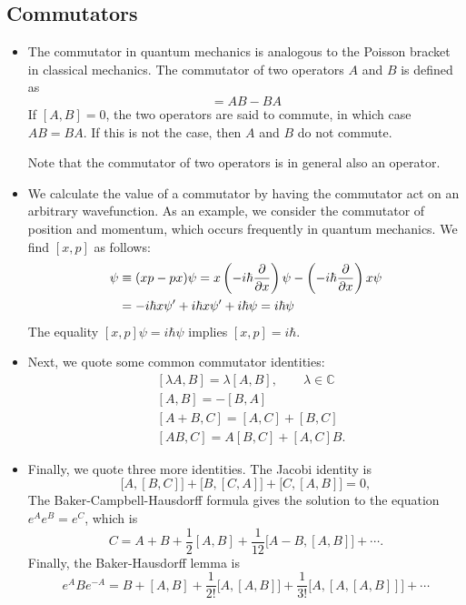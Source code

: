 \documentclass[11pt, a4paper]{article}
\newcommand{\p}{\psi}  %
\begin{document}
\subsection{Commutators}
\begin{itemize}
	\item The commutator in quantum mechanics is analogous to the Poisson bracket in classical mechanics. The commutator of two operators $ A $ and $ B $ is defined as
	\begin{equation*}
		[A, B] = AB - BA
	\end{equation*}
	If $ [A, B] = 0 $, the two operators are said to commute, in which case $ AB = BA $. If this is not the case, then $ A $ and $ B $ do not commute.
	
	Note that the commutator of two operators is in general also an operator.
	
	\item We calculate the value of a commutator by having the commutator act on an arbitrary wavefunction. As an example, we consider the commutator of position and momentum, which occurs frequently in quantum mechanics. We find $ [x, p] $ as follows:
	\begin{align*}
		[x, p] \p &\equiv (xp - px)\p = x \left(- i\hbar \pdv{x}\right)\p - \left(- i\hbar \pdv{x}\right)x \p \\
		& = - i\hbar x \p ' + i \hbar x \p ' + i \hbar \p = i \hbar \p
	\end{align*}
	The equality $ [x, p] \p = i \hbar \p $ implies $ [x, p] = i \hbar $.
	
	\item Next, we quote some common commutator identities:
	\begin{align*}
		&[\lambda A, B] = \lambda [A, B], \qquad \lambda \in \mathbb{C} \\
		&[A, B] = - [B, A]\\
		&[A + B, C] = [A, C] + [B, C]\\
		& [AB, C] = A[B, C] + [A, C]B.
	\end{align*}
	
	\item Finally, we quote three more identities. The Jacobi identity is
	\begin{equation*}
		\big[A, [B, C]\big] + \big[B, [C, A]\big] + \big[C, [A, B]\big] = 0,
	\end{equation*}
	The Baker-Campbell-Hausdorff formula gives the solution to the equation $ e^{A}e^{B} = e^{C} $, which is
	\begin{equation*}
		C = A + B + \frac{1}{2}[A, B] + \frac{1}{12}\big[A - B, [A, B]\big] + \cdots.
	\end{equation*}
	Finally, the Baker-Hausdorff lemma is
	\begin{equation*}
		e^{A}Be^{-A} = B + [A, B] + \frac{1}{2!}\big[A, [A, B]\big] + \frac{1}{3!} \big[A, [A, [A, B]]\big] + \cdots
	\end{equation*}
	
\end{itemize}
\end{document}
